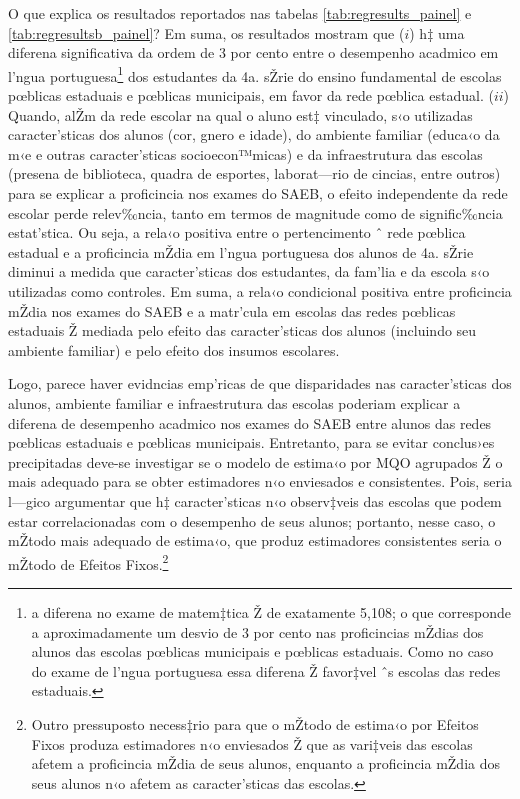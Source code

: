 \documentclass[a4paper, 12pt]{article}
\begin{document}
O que explica os resultados reportados nas tabelas \ref{tab:regresults_painel} e \ref{tab:regresultsb_painel}? Em suma, os resultados mostram que ($i$) h‡ uma diferena significativa da ordem de 3 por cento entre o desempenho acadmico em l’ngua portuguesa\footnote{a diferena no exame de matem‡tica Ž de exatamente 5,108; o que corresponde a aproximadamente um desvio de 3 por cento nas proficincias mŽdias dos alunos das escolas pœblicas municipais e pœblicas estaduais. Como no caso do exame de l’ngua portuguesa essa diferena Ž favor‡vel ˆs escolas das redes estaduais.} dos estudantes da 4a. sŽrie do ensino fundamental de escolas pœblicas estaduais e pœblicas municipais, em favor da rede pœblica estadual. ($ii$) Quando, alŽm da rede escolar na qual o aluno est‡ vinculado, s‹o utilizadas caracter’sticas dos alunos (cor, gnero e idade), do ambiente familiar (educa‹o da m‹e e outras caracter’sticas socioecon™micas) e da infraestrutura das escolas (presena de biblioteca, quadra de esportes, laborat—rio de cincias, entre outros) para se explicar a proficincia nos exames do SAEB, o efeito independente da rede escolar perde relev‰ncia, tanto em termos de magnitude como de signific‰ncia estat’stica. Ou seja, a rela‹o positiva entre o pertencimento ˆ rede pœblica estadual e a proficincia mŽdia em l’ngua portuguesa dos alunos de 4a. sŽrie diminui a medida que caracter’sticas dos estudantes, da fam’lia e da escola s‹o utilizadas como controles. Em suma, a rela‹o condicional positiva entre proficincia mŽdia nos exames do SAEB e a matr’cula em escolas das redes pœblicas estaduais Ž mediada pelo efeito das caracter’sticas dos alunos (incluindo seu ambiente familiar) e pelo efeito dos insumos escolares.

Logo, parece haver evidncias emp’ricas de que disparidades nas caracter’sticas dos alunos, ambiente familiar e infraestrutura das escolas poderiam explicar a diferena de desempenho acadmico nos exames do SAEB entre alunos das redes pœblicas estaduais e pœblicas municipais. Entretanto, para se evitar conclus›es precipitadas deve-se investigar se o modelo de estima‹o por MQO agrupados Ž o mais adequado para se obter estimadores n‹o enviesados e consistentes. Pois, seria l—gico argumentar que h‡ caracter’sticas n‹o observ‡veis das escolas que podem estar correlacionadas com o desempenho de seus alunos; portanto, nesse caso, o mŽtodo mais adequado de estima‹o, que produz estimadores consistentes seria o mŽtodo de Efeitos Fixos.\footnote{Outro pressuposto necess‡rio para que o mŽtodo de estima‹o por Efeitos Fixos produza estimadores n‹o enviesados Ž que as vari‡veis das escolas afetem a proficincia mŽdia de seus alunos, enquanto a proficincia mŽdia dos seus alunos n‹o afetem as caracter’sticas das escolas.}
\end{document}
